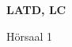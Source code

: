 \documentclass[a4paper]{article}
\begin{document}
\printGenericVSLHeader
\begin{center}
\begin{vsltext}{3cm}{4cm}

   \vspace{0.5cm} 

    \textbf{LATD, LC} 

    \vspace{1.5cm}

    Hörsaal 1

\end{vsltext}

\end{center}
\end{document}
